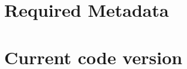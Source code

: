 \documentclass[preprint,letterpaper]{elsarticle}
\begin{document}
%
%
%
%
%


\section*{Required Metadata}

\section*{Current code version}
\end{document}
